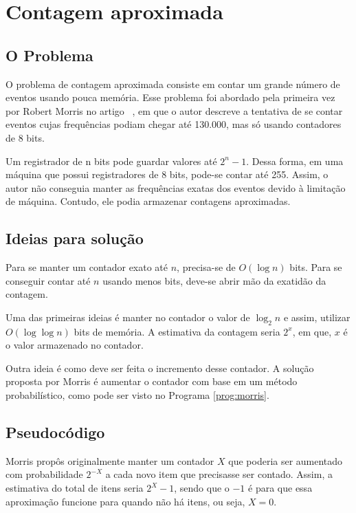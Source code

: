 \chapter{Contagem aproximada}
\label{chap:morris}


\section{O Problema}

O problema de contagem aproximada consiste em contar um grande número de eventos usando pouca memória.  
Esse problema foi abordado pela primeira vez por Robert  Morris no artigo ~\citep{morris:78}, 
em que o autor descreve a tentativa de se contar eventos cujas frequências podiam chegar até 130.000, mas só usando contadores de 8 bits.

Um registrador de n bits pode guardar valores até $2^n-1$. Dessa forma, em uma máquina que possui registradores de 8 bits, pode-se contar até 255.
Assim, o autor não conseguia manter as frequências exatas dos eventos devido à limitação de máquina. 
Contudo, ele podia armazenar contagens aproximadas.


\section{Ideias para solução}

Para se manter um contador exato até $n$, precisa-se de $O(\log n)$ bits. Para se conseguir contar até $n$ usando menos bits, 
deve-se abrir mão da exatidão da contagem. 

Uma das primeiras ideias é manter no contador o valor de $\log_2 n$ e assim, utilizar $O(\log \log n)$ bits de memória. 
A estimativa da contagem seria $2^x$, em que, $x$ é o valor armazenado no contador.

Outra ideia é como deve ser feita o incremento desse contador. 
A solução proposta por Morris é aumentar o contador com base em um método probabilístico, como pode ser visto no Programa \ref{prog:morris}. 


\section{Pseudocódigo}

Morris propôs originalmente manter um contador $X$ que poderia ser aumentado com probabilidade $2^{-X}$ a cada novo item que precisasse ser contado.
Assim, a estimativa do total de itens seria $2^{X} - 1$, sendo que o $-1$ é para que essa aproximação funcione para quando não há itens, ou seja, $X = 0$.

